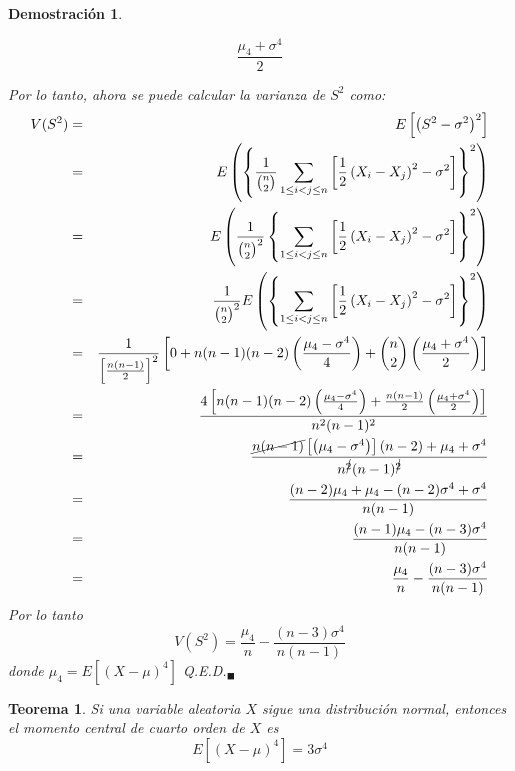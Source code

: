 \documentclass[a4paper,11pt]{article}
\theoremstyle{teoremas}
\newtheorem{teorema}{Teorema}[section]
\theoremstyle{ejemplos}
\theoremstyle{definiciones}
\theoremstyle{lemas}
\newtheorem*{demostracion}{Demostraci\'on}
\begin{document}
\begin{demostracion}
\begin{description}
  \begin{equation*}
   \frac{\mu_4 + \sigma^4}{2}
  \end{equation*}
 \end{description}
 Por lo tanto, ahora se puede calcular la varianza de $S^2$ como:
 \begin{eqnarray*}
  V(S^2) & = & E\left[ \left( S^2 - \sigma^2 \right)^2 \right] \\
    & = & E\left( \left\{ \frac{1}{\binom{n}{2}} \sum_{1 \leq i < j \leq n} \left[ \frac{1}{2}\left( X_i - X_j \right)^2 - \sigma^2 \right] \right\}^2 \right) \\ 
    & = & E\left( \frac{1}{\binom{n}{2}^2} \left\{ \sum_{1 \leq i < j \leq n} \left[ \frac{1}{2}\left( X_i - X_j \right)^2 - \sigma^2 \right] \right\}^2 \right) \\ 
    & = & \frac{1}{\binom{n}{2}^2} E\left(  \left\{ \sum_{1 \leq i < j \leq n} \left[ \frac{1}{2}\left( X_i - X_j \right)^2 - \sigma^2 \right] \right\}^2 \right) \\ 
    & = & \frac{1}{\left[ \frac{n(n-1)}{2} \right]^2} \left[ 0 + n(n-1)(n-2)\left( \frac{\mu_4 - \sigma^4}{4} \right) + \binom{n}{2}\left( \frac{\mu_4 + \sigma^4}{2} \right) \right] \\ 
    & = & \frac{4\left[ n(n-1)(n-2)\left( \frac{\mu_4 - \sigma^4}{4} \right) + \frac{n(n-1)}{2}\left( \frac{\mu_4 + \sigma^4}{2} \right) \right]}{n^2(n-1)^2} \\ 
    & = & \frac{\cancel{n(n-1)}\left[\left( \mu_4 - \sigma^4 \right)\right](n-2) + \mu_4 + \sigma^4}{n^{\cancel{2}}(n-1)^{\cancel{2}}} \\ 
    & = & \frac{(n-2)\mu_4 + \mu_4 - (n-2)\sigma^4 + \sigma^4}{n(n-1)} \\ 
    & = & \frac{(n-1)\mu_4 - (n-3)\sigma^4}{n(n-1)} \\ 
    & = & \frac{\mu_4}{n} - \frac{(n-3)\sigma^4}{n(n-1)}
 \end{eqnarray*}
 Por lo tanto
 \begin{equation*}
  V\left( S^2 \right) = \frac{\mu_4}{n} - \frac{(n-3)\sigma^4}{n(n-1)}
 \end{equation*}
 donde 
  $\mu_4 = E\left[ \left( X - \mu \right)^4 \right]$
 Q.E.D.${}_{\blacksquare}$
\end{demostracion}

\begin{teorema} \label{Teorema:MomentosNormal}
 Si una variable aleatoria $X$ sigue una distribuci\'on normal, entonces el momento central de cuarto orden de $X$ es
 \begin{equation} \label{Eq:MomentosNormal}
  E\left[ \left( X - \mu \right)^4 \right] = 3\sigma^4
 \end{equation}
\end{teorema}
\end{document}
